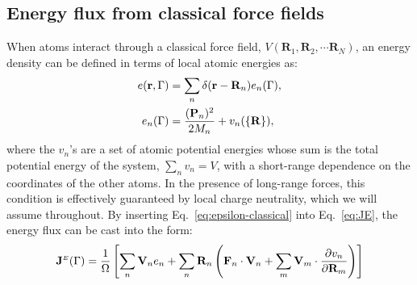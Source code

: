 \subsection{Energy flux from classical force fields}
When atoms interact through a classical force field, $V(\mathbf{R}_1,\mathbf{R}_2,\cdots \mathbf{R}_N)$, an energy density can be defined in terms of local atomic energies as:
\begin{align}
  e(\mathbf{r},\rGamma) &= \sum_n \delta(\mathbf{r}-\mathbf{R}_n) e_n(\rGamma), \label{eq:epsilon-classical} \\
  e_n(\rGamma) &= \frac{(\mathbf{P}_n)^2}{2M_n} + v_n(\{\mathbf{R}\}), \label{eq:atomic-energies}
\end{align}
where the $v_n$'s are a set of atomic potential energies whose sum is the total potential energy of the system, $\sum_n v_n=V$, with a short-range dependence on the coordinates of the other atoms. In the presence of long-range forces, this condition is effectively guaranteed by local charge neutrality, which we will assume throughout.
By inserting Eq.~\eqref{eq:epsilon-classical} into Eq.~\eqref{eq:JE}, the energy flux can be cast into the form:
\begin{equation}
  \mathbf{J}^\smallE(\rGamma) =
        \frac{1}{\rOmega} \left[ \sum_n \mathbf{V}_n e_n + \sum_n \mathbf{R}_n
        \left( \mathbf{F}_n \cdot \mathbf{V}_n  + \sum_m \mathbf{V}_m \cdot {\frac{\partial v_n}{\partial \mathbf{R}_m}} \right) \right] \label{eq:J-classical}
\end{equation}

